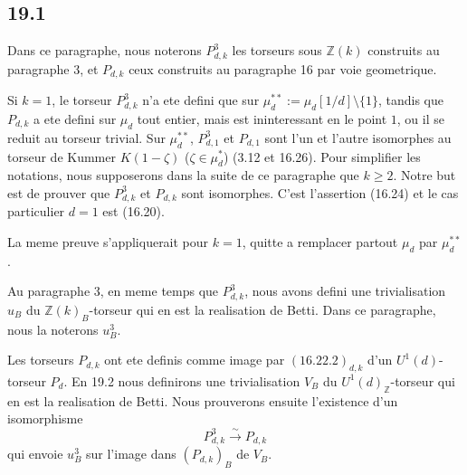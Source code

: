 \documentclass[12pt,a4paper]{article}
\theoremstyle{plain}
\theoremstyle{definition}
\theoremstyle{remark}
\newcommand{\Betti}{B}
\newcommand{\ZZ}{\mathbb{Z}}
\begin{document}
\subsection{19.1}

Dans ce paragraphe, nous noterons $P^3_{d,k}$ les torseurs sous
$\ZZ(k)$ construits au paragraphe 3, et $P_{d,k}$ ceux construits au
paragraphe 16 par voie geometrique.

Si $k=1$, le torseur $P^3_{d,k}$ n'a ete defini que sur
$\mu_d^{**} := \mu_d[1/d] \setminus \{1\}$, tandis que $P_{d,k}$ a
ete defini sur $\mu_d$ tout entier, mais est ininteressant en le point
$1$, ou il se reduit au torseur trivial. Sur $\mu_d^{**}$, $P^3_{d,1}$
et $P_{d,1}$ sont l'un et l'autre isomorphes au torseur de Kummer
$K(1-\zeta)$ ($\zeta \in \mu_d^*$) (3.12 et 16.26). Pour simplifier les
notations, nous supposerons dans la suite de ce paragraphe que
$k \geq 2$. Notre but est de prouver que $P^3_{d,k}$ et $P_{d,k}$
sont isomorphes. C'est l'assertion (16.24) et le cas particulier $d=1$
est (16.20).

La meme preuve s'appliquerait pour $k=1$, quitte a remplacer partout
$\mu_d$ par $\mu_d^{**}$.

Au paragraphe 3, en meme temps que $P^3_{d,k}$, nous avons defini une
trivialisation $u_\Betti$ du $\ZZ(k)_\Betti$-torseur qui en est la
realisation de Betti. Dans ce paragraphe, nous la noterons $u^3_\Betti$.

Les torseurs $P_{d,k}$ ont ete definis comme image par
$(16.22.2)_{d,k}$ d'un $U^1(d)$-torseur $P_d$. En 19.2 nous
definirons une trivialisation $V_\Betti$ du $U^1(d)_\ZZ$-torseur qui
en est la realisation de Betti. Nous prouverons ensuite l'existence
d'un isomorphisme
\begin{equation}\label{eq:19.1.1}
P^3_{d,k} \xrightarrow{\sim} P_{d,k}
\end{equation}
qui envoie $u^3_\Betti$ sur l'image dans $(P_{d,k})_\Betti$ de
$V_\Betti$.
\end{document}
